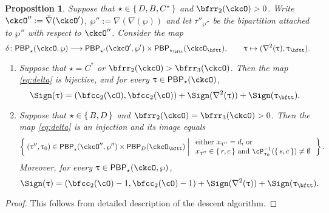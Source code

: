 \documentclass[12pt,a4paper]{amsart}
\def\tauwppp{\tau''_{\wp''}}
\def\ckDD{{\check\DD}}
\def\DD{\nabla}
\numberwithin{equation}{section}
\newtheorem{prop}[thm]{Proposition}
\theoremstyle{remark}
\def\DD{\nabla}
\def\PBP{\mathsf{PBP}}
\def\ckcOpp{\ckcO''}
\def\PBPop#1#2#3#4{\PBP_{#1}^{#2}(#3,#4)}
\newcommand{\PBPOP}[1][]{\PBPop{\star}{#1}{\ckcO}{\wp}}
\def\PBPOPp{\PBPop{\star'}{}{\ckcO'}{\wp'}}
\newcommand{\PBPOPpp}[1][]{\PBPop{\star}{#1}{\ckcO''}{\wp''}}
\begin{document}
\begin{prop}
\label{lem:delta}
Suppose that $\star \in \set{D,B,C^*}$ and $\bfrr_2(\ckcO)>0$. Write
$\ckcOpp := \ckDD(\ckcO')$, $\wp'':= \DD(\DD(\wp))$ and let $\tauwppp$ be the
bipartition attached to $\wp''$ with respect to $\ckcO''$. Consider the map
\begin{equation}\label{eq:delta}
  \delta  \colon \PBPOP \longrightarrow
    \PBPOPp \times \PBP_{\star_\bftt}(\ckcO_\bftt),
    \qquad \uptau \mapsto (\DD^2(\uptau),\uptau_\bftt).
\end{equation}
\begin{enumerate}[label=(\alph*)]
\item Suppose that
$\star = C^*$ or $\bfrr_2(\ckcO)>\bfrr_3(\ckcO)$. Then the map \eqref{eq:delta} is bijective, and for every $\uptau\in  \PBP_\star(\ckcO) $,
\begin{equation}\label{eq:sign.D}
\Sign(\uptau)
=(\bfcc_2(\cO),\bfcc_2(\cO))+\Sign(\DD^2(\uptau))+\Sign(\uptau_\bftt).
\end{equation}

\item Suppose that  $\star \in \set{B,D}$ and $\bfrr_2(\ckcO)=\bfrr_3(\ckcO)>0$.
Then the map \eqref{eq:delta} is an  injection and its  image equals
\begin{equation}\label{eq:delta.I}
    \Set{ (\uptau'',\uptau_0)  \in \PBPOPpp \times \PBP_D(\ckcO_\bftt)  |
    \begin{array}{l}
        \text{either
    $x_{\uptau''} = d$, or} \\
    \text{$x_{\uptau''}\in \set{r,c}$  and
    $\cP_{\uptau_0}^{-1}(\set{s,c})\neq \emptyset$}
    \end{array}
}.
\end{equation}
Moreover,  for every $\uptau\in  \PBPOP$,
\begin{equation}\label{eq:sign.GD}
\Sign(\uptau)
=(\bfcc_2(\cO)-1,\bfcc_2(\cO)-1)+\Sign(\DD^2(\uptau))+\Sign(\uptau_\bftt).
\end{equation}
\end{enumerate}
\end{prop}
\begin{proof}
  This follows from detailed description of the descent algorithm.
\end{proof}
\end{document}
